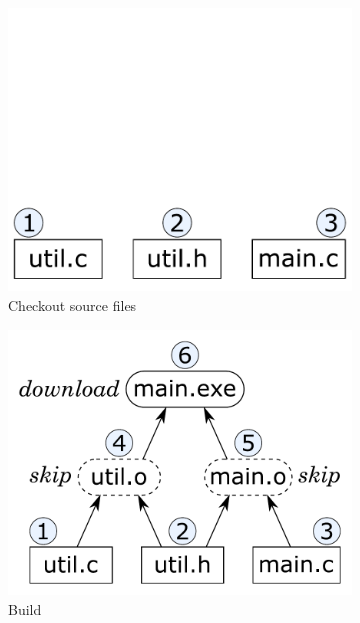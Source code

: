\begin{figure}[t]
\begin{subfigure}[b]{0.25\linewidth}
\centerline{\includegraphics[scale=0.28]{fig/bazel-example-checkout.pdf}}
\caption{Checkout source files}
\end{subfigure}
\begin{subfigure}[b]{0.40\linewidth}
\centerline{\includegraphics[scale=0.28]{fig/bazel-example-build.pdf}}
\caption{Build }
\end{subfigure}
\begin{subfigure}[b]{0.31\linewidth}

\end{subfigure}
\end{figure}
